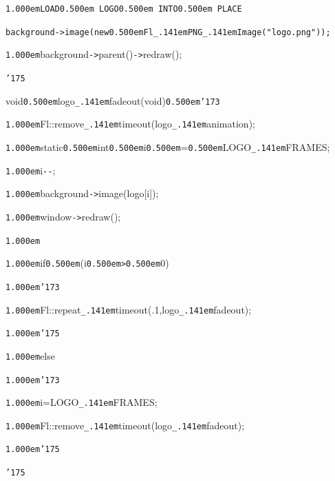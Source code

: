 \documentclass[12pt]{article}
\begin{document}
\noindent
{}{\tt\mc \kern1.000em}\tt\mc {\tt /}{\tt /}LOAD\kern0.500em LOGO\kern0.500em INTO\kern0.500em PLACE

\noindent
\tt\mc {\tt\mc \kern1.000em}background{\tt -}{\tt >}image(new{\tt\mc \kern0.500em}Fl{\tt\_\kern.141em}PNG{\tt\_\kern.141em}Image({\tt "}logo.png{\tt "}));

\noindent
{}{\tt\mc \kern1.000em}background{\tt -}{\tt >}parent(){\tt -}{\tt >}redraw();

\noindent
{}{\tt\char'175}

\noindent
{}\hfill

\noindent
{}void{\tt\mc \kern0.500em}logo{\tt\_\kern.141em}fadeout(void{\tt *}){\tt\mc \kern0.500em}{\tt\char'173}

\noindent
{}{\tt\mc \kern1.000em}Fl::remove{\tt\_\kern.141em}timeout(logo{\tt\_\kern.141em}animation);

\noindent
{}{\tt\mc \kern1.000em}static{\tt\mc \kern0.500em}int{\tt\mc \kern0.500em}i{\tt\mc \kern0.500em}={\tt\mc \kern0.500em}LOGO{\tt\_\kern.141em}FRAMES;

\noindent
{}{\tt\mc \kern1.000em}i{\tt -}{\tt -};

\noindent
{}{\tt\mc \kern1.000em}background{\tt -}{\tt >}image(logo[i]);

\noindent
{}{\tt\mc \kern1.000em}window{\tt -}{\tt >}redraw();

\noindent
{}{\tt\mc \kern1.000em}

\noindent
{}{\tt\mc \kern1.000em}if{\tt\mc \kern0.500em}(i{\tt\mc \kern0.500em}{\tt >}{\tt\mc \kern0.500em}0)

\noindent
{}{\tt\mc \kern1.000em}{\tt\char'173}

\noindent
{}{\tt\mc \kern1.000em}Fl::repeat{\tt\_\kern.141em}timeout(.1,logo{\tt\_\kern.141em}fadeout);

\noindent
{}{\tt\mc \kern1.000em}{\tt\char'175}

\noindent
{}{\tt\mc \kern1.000em}else

\noindent
{}{\tt\mc \kern1.000em}{\tt\char'173}

\noindent
{}{\tt\mc \kern1.000em}i=LOGO{\tt\_\kern.141em}FRAMES;

\noindent
{}{\tt\mc \kern1.000em}Fl::remove{\tt\_\kern.141em}timeout(logo{\tt\_\kern.141em}fadeout);

\noindent
{}{\tt\mc \kern1.000em}{\tt\char'175}

\noindent
{}{\tt\char'175}

\noindent
{}\hfill
\end{document}
